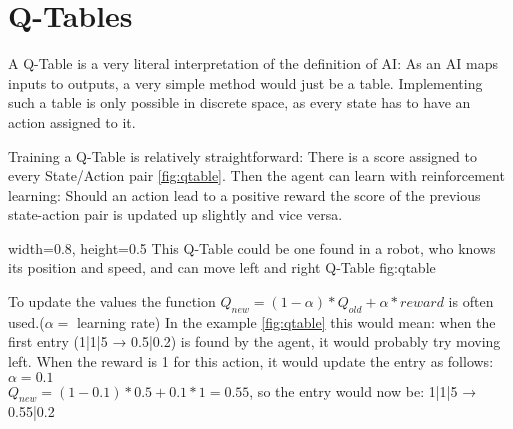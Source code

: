 \section{Q-Tables}
\label{sec:QTable}
\cite[TicTacToe Example]{c4f}
A Q-Table is a very literal interpretation of the definition of AI: As an AI maps inputs to outputs, a very simple method would just be a table. Implementing such a table is only possible in discrete space, as every state has to have an action assigned to it.

Training a Q-Table is relatively straightforward: There is a score assigned to every State/Action pair \autoref{fig:qtable}. Then the agent can learn with reinforcement learning: Should an action lead to a positive reward the score of the previous state-action pair is updated up slightly and vice versa.

    {width=0.8\textwidth, height=0.5\textheight} %
    {This Q-Table could be one found in a robot, who knows its position and speed, and can move left and right}   %
    {Q-Table}   %
    {fig:qtable}    %

To update the values the function $Q_{new}=(1-\alpha)*Q_{old}+\alpha*reward$ is often used.($\alpha=$ learning rate)
In the example \autoref{fig:qtable} this would mean: when the first entry (1|1|5 → 0.5|0.2) is found by the agent, it would probably try moving left. When the reward is 1 for this action, it would update the entry as follows: $\alpha=0.1$\\$Q_{new}=(1-0.1)*0.5+0.1*1=0.55$, so the entry would now be: 1|1|5 → 0.55|0.2

